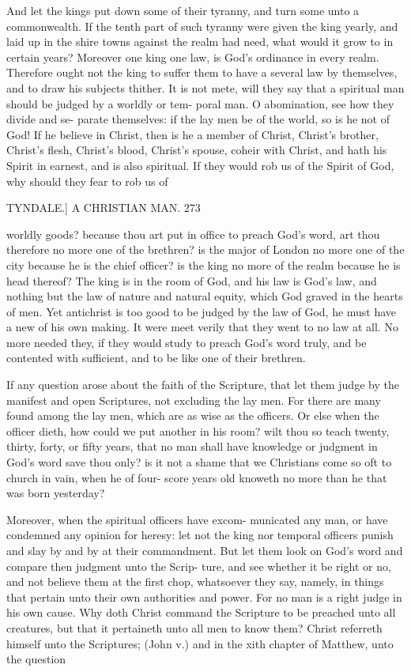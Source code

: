 \documentclass{custom}
\begin{document}
{And let the kings put down some of their tyranny, and 
turn some unto a commonwealth. If the tenth part of 
such tyranny were given the king yearly, and laid up in the 
shire towns against the realm had need, what would it grow 
to in certain years? Moreover one king one law, is God's 
ordinance in every realm. Therefore ought not the king to 
suffer them to have a several law by themselves, and to 
draw his subjects thither. It is not mete, will they say 
that a spiritual man should be judged by a worldly or tem- 
poral man. O abomination, see how they divide and se- 
parate themselves: if the lay men be of the world, so is he 
not of God! If he believe in Christ, then is he a member 
of Christ, Christ's brother, Christ's flesh, Christ's blood, 
Christ's spouse, coheir with Christ, and hath his Spirit 
in earnest, and is also spiritual. If they would rob us of 
the Spirit of God, why should they fear to rob us of 


TYNDALE.]
A CHRISTIAN MAN.
273

worldly goods? because thou art put in office to preach 
God's word, art thou therefore no more one of the 
brethren? is the major of London no more one of the city 
because he is the chief officer? is the king no more of the 
realm because he is head thereof? The king is in the room 
of God, and his law is God's law, and nothing but the law 
of nature and natural equity, which God graved in the 
hearts of men. Yet antichrist is too good to be judged 
by the law of God, he must have a new of his own making. 
It were meet verily that they went to no law at all. No 
more needed they, if they would study to preach God's word 
truly, and be contented with sufficient, and to be like one 
of their brethren. 

If any question arose about the faith of the Scripture, that 
let them judge by the manifest and open Scriptures, not 
excluding the lay men. For there are many found among 
the lay men, which are as wise as the officers. Or else 
when the officer dieth, how could we put another in his 
room? wilt thou so teach twenty, thirty, forty, or fifty 
years, that no man shall have knowledge or judgment in 
God's word save thou only? is it not a shame that we 
Christians come so oft to church in vain, when he of four- 
score years old knoweth no more than he that was born 
yesterday? 

Moreover, when the spiritual officers have excom- 
municated any man, or have condemned any opinion for 
heresy: let not the king nor temporal officers punish and 
slay by and by at their commandment. But let them look 
on God's word and compare then judgment unto the Scrip- 
ture, and see whether it be right or no, and not believe 
them at the first chop, whatsoever they say, namely, in 
things that pertain unto their own authorities and power. 
For no man is a right judge in his own cause. Why doth 
Christ command the Scripture to be preached unto all 
creatures, but that it pertaineth unto all men to know 
them? Christ referreth himself unto the Scriptures; (John 
v.) and in the xith chapter of Matthew, unto the question 

}
\end{document}
